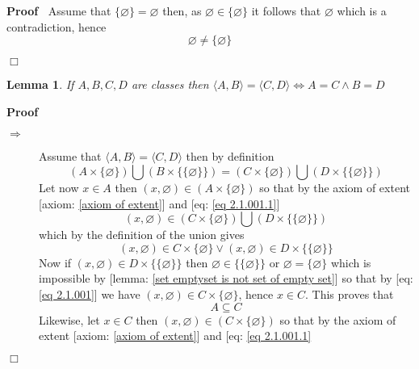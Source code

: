 \documentclass{book}
\newenvironment{proof}{\noindent\textbf{Proof\ }}{\hspace*{\fill}$\Box$\medskip}
\newtheorem{lemma}{Lemma}
\begin{document}
\begin{proof}
  Assume that $\{ \varnothing \} = \varnothing$ then, as $\varnothing \in \{
  \varnothing \}$ it follows that $\varnothing$ which is a contradiction,
  hence
  \[ \varnothing \neq \{ \varnothing \} \]
  
\end{proof}

\begin{lemma}
  \label{<less>A,B<gtr>=<less>C,D<gtr>=<gtr>A=C,B=D}If $A, B, C, D$ are
  classes then $\langle A, B \rangle = \langle C, D \rangle \Leftrightarrow A
  = C \wedge B = D$
\end{lemma}

\begin{proof}
  
  \begin{description}
    \item[$\Rightarrow$] Assume that $\langle A, B \rangle = \langle C, D
    \rangle$ then by definition
    \begin{equation}
      \label{eq 2.1.001.1} (A \times \{ \varnothing \}) \bigcup (B \times \{
      \{ \varnothing \} \}) = (C \times \{ \varnothing \}) \bigcup (D \times
      \{ \{ \varnothing \} \})
    \end{equation}
    Let now $x \in A$ then $(x, \varnothing) \in (A \times \{ \varnothing \})$
    so that by the axiom of extent [axiom: \ref{axiom of extent}] and [eq:
    \ref{eq 2.1.001.1}]
    \[ (x, \varnothing) \in (C \times \{ \varnothing \}) \bigcup (D \times \{
       \{ \varnothing \} \}) \]
    which by the definition of the union gives
    \begin{equation}
      \label{eq 2.1.001} (x, \varnothing) \in C \times \{ \varnothing \} \vee
      (x, \varnothing) \in D \times \{ \{ \varnothing \} \}
    \end{equation}
    Now if $(x, \varnothing) \in D \times \{ \{ \varnothing \} \}$ then
    $\varnothing \in \{ \{ \varnothing \} \}$ or $\varnothing = \{ \varnothing
    \}$ which is impossible by [lemma: \ref{set emptyset is not set of empty
    set}] so that by [eq: \ref{eq 2.1.001}] we have $(x, \varnothing) \in C
    \times \{ \varnothing \}$, hence $x \in C$. This proves that
    \begin{equation}
      \label{eq 2.3.001.2} A \subseteq C
    \end{equation}
    Likewise, let $x \in C$ then $(x, \varnothing) \in (C \times \{
    \varnothing \})$ so that by the axiom of extent [axiom: \ref{axiom of
    extent}] and [eq: \ref{eq 2.1.001.1}

\end{description}
\end{proof}
\end{document}
